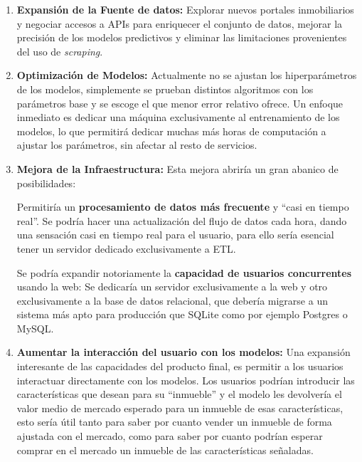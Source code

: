 \begin{enumerate}
  \item \textbf{Expansión de la Fuente de datos:} Explorar nuevos portales inmobiliarios y negociar accesos a APIs para enriquecer el conjunto de datos, mejorar la precisión de los modelos predictivos y eliminar las limitaciones provenientes del uso de \textit{scraping}.
  \item \textbf{Optimización de Modelos:} Actualmente no se ajustan los hiperparámetros de los modelos, simplemente se prueban distintos algoritmos con los parámetros base y se escoge el que menor error relativo ofrece. Un enfoque inmediato es dedicar una máquina exclusivamente al entrenamiento de los modelos, lo que permitirá dedicar muchas más horas de computación a ajustar los parámetros, sin afectar al resto de servicios. 
  \item \textbf{Mejora de la Infraestructura:} Esta mejora abriría un gran abanico de posibilidades:

   Permitiría un \textbf{procesamiento de datos más frecuente} y ``casi en tiempo real''. Se podría hacer una actualización del flujo de datos cada hora, dando una sensación casi en tiempo real para el usuario, para ello sería esencial tener un servidor dedicado exclusivamente a ETL.

   Se podría expandir notoriamente la \textbf{capacidad de usuarios concurrentes} usando la web: Se dedicaría un servidor exclusivamente a la web y otro exclusivamente a la base de datos relacional, que debería migrarse a un sistema más apto para producción que SQLite como por ejemplo Postgres o MySQL.
  
  \item \textbf{Aumentar la interacción del usuario con los modelos:} Una expansión interesante de las capacidades del producto final, es permitir a los usuarios interactuar directamente con los modelos. Los usuarios podrían introducir las características que desean para su ``inmueble'' y el modelo les devolvería el valor medio de mercado esperado para un inmueble de esas características, esto sería útil tanto para saber por cuanto vender un inmueble de forma ajustada con el mercado, como para saber por cuanto podrían esperar comprar en el mercado un inmueble de las características señaladas.


\end{enumerate}
